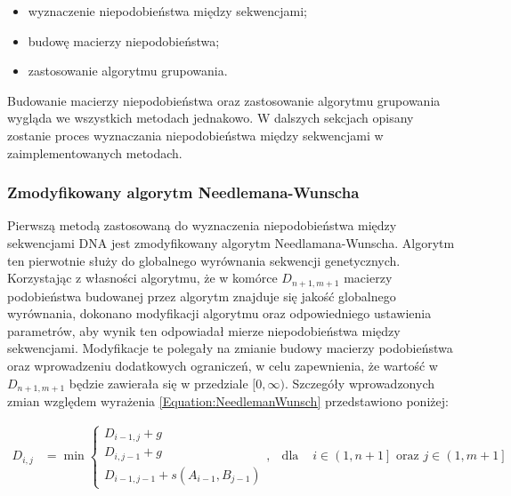         \begin{itemize}
            \item {
                wyznaczenie niepodobieństwa między sekwencjami;
            }
            \item {
                budowę macierzy niepodobieństwa;
            }
            \item {
                zastosowanie algorytmu grupowania.
            }
        \end{itemize}

        Budowanie macierzy niepodobieństwa oraz zastosowanie algorytmu grupowania wygląda we wszystkich metodach jednakowo. W dalszych sekcjach opisany zostanie proces wyznaczania niepodobieństwa między sekwencjami w zaimplementowanych metodach.
        
        \subsubsection{Zmodyfikowany algorytm Needlemana-Wunscha}\label{Method:NeedlemanWunsch}

            Pierwszą metodą zastosowaną do wyznaczenia niepodobieństwa między sekwencjami DNA jest  zmodyfikowany algorytm Needlamana-Wunscha. Algorytm ten pierwotnie służy do globalnego wyrównania sekwencji genetycznych. Korzystając z własności algorytmu, że w komórce $D_{n+1, m+1}$ macierzy podobieństwa budowanej przez algorytm znajduje się jakość globalnego wyrównania, dokonano modyfikacji algorytmu oraz odpowiedniego ustawienia parametrów, aby wynik ten odpowiadał mierze niepodobieństwa między sekwencjami. Modyfikacje te polegały na zmianie budowy macierzy podobieństwa oraz wprowadzeniu dodatkowych ograniczeń, w celu zapewnienia, że wartość w $D_{n+1, m+1}$ będzie zawierała się w przedziale $[0, \infty)$. Szczegóły wprowadzonych zmian względem wyrażenia \eqref{Equation:NeedlemanWunsch} przedstawiono poniżej:

            \begin{equation}
                \begin{aligned}
                    D_{i,j} &= \min
                    \begin{cases}
                    D_{i - 1, j} + g \\
                    D_{i, j - 1} + g \\
                    D_{i - 1, j - 1} + s(A_{i - 1}, B_{j - 1})
                    \end{cases}, & \text{dla } & i \in \left(1, n + 1\right] \text{ oraz } j \in \left(1, m + 1\right] \\
                \end{aligned}
            \end{equation}

